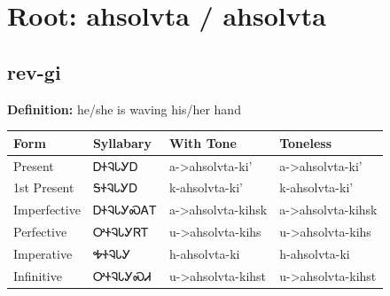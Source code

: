 \documentclass{article}%
\begin{document}
%
\normalsize%
\section*{Root: ahsolvta / ahsolvta}%
\subsection*{rev-gi}%
\textbf{Definition: }%
he/she is waving his/her hand%
\\[0.5em]%
\begin{tabular}{|l|l|l|l|}%
\hline%
\textbf{Form}&\textbf{Syllabary}&\textbf{With Tone}&\textbf{Toneless}\\%
\hline%
Present&ᎠᏐᎸᏓᎩᎠ&a{-}>ahsolvta{-}ki'&a{-}>ahsolvta{-}ki'\\%
1st Present&ᎦᏐᎸᏓᎩᎠ&k{-}ahsolvta{-}ki'&k{-}ahsolvta{-}ki'\\%
Imperfective&ᎠᏐᎸᏓᎩᏍᎪᎢ&a{-}>ahsolvta{-}kihsk&a{-}>ahsolvta{-}kihsk\\%
Perfective&ᎤᏐᎸᏓᎩᏒᎢ&u{-}>ahsolvta{-}kihs&u{-}>ahsolvta{-}kihs\\%
Imperative&ᎭᏐᎸᏓᎩ&h{-}ahsolvta{-}ki&h{-}ahsolvta{-}ki\\%
Infinitive&ᎤᏐᎸᏓᎩᏍᏗ&u{-}>ahsolvta{-}kihst&u{-}>ahsolvta{-}kihst\\%
\hline%
\end{tabular}%
\\[1em]%
\end{document}
